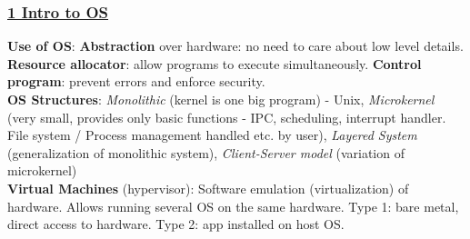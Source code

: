 \documentclass{article}
\begin{document}
\titlespacing*{\subsubsection}{0pt}{1pt}{1pt}

\pagestyle{fancy}
\fancyhf{}
\renewcommand{\headrulewidth}{0pt}

\begin{multicols*}{3}

\subsubsection*{\underline{1 Intro to OS}}
\textbf{Use of OS}: \textbf{Abstraction} over hardware: no need to care about low level details. \textbf{Resource allocator}: allow programs to execute simultaneously. \textbf{Control program}: prevent errors and enforce security. \\
\textbf{OS Structures}: \textit{Monolithic} (kernel is one big program) - Unix, \textit{Microkernel} (very small, provides only basic functions - IPC, scheduling, interrupt handler. File system / Process management handled etc. by user), \textit{Layered System} (generalization of monolithic system), \textit{Client-Server model} (variation of microkernel) \\
\textbf{Virtual Machines} (hypervisor): Software emulation (virtualization) of hardware. Allows running several OS on the same hardware. Type 1: bare metal, direct access to hardware. Type 2: app installed on host OS. 

\end{multicols*}
\end{document}
